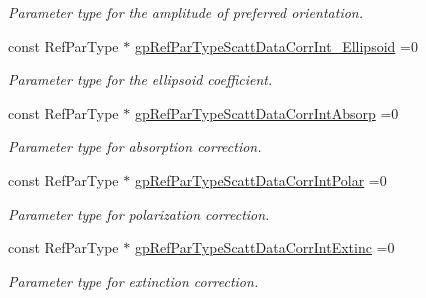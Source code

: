 \begin{DoxyCompactItemize}
\begin{DoxyCompactList}\small\item\em Parameter type for the amplitude of preferred orientation. \end{DoxyCompactList}\item 
\mbox{\label{namespace_obj_cryst_a90f81e18ffcae437b1fb46c56ffee2e5}} 
const Ref\+Par\+Type $\ast$ \mbox{\hyperlink{namespace_obj_cryst_a90f81e18ffcae437b1fb46c56ffee2e5}{gp\+Ref\+Par\+Type\+Scatt\+Data\+Corr\+Int\+\_\+\+Ellipsoid}} =0
\begin{DoxyCompactList}\small\item\em Parameter type for the ellipsoid coefficient. \end{DoxyCompactList}\item 
\mbox{\label{namespace_obj_cryst_a4eb6ef574a91724b70612235904156dc}} 
const Ref\+Par\+Type $\ast$ \mbox{\hyperlink{namespace_obj_cryst_a4eb6ef574a91724b70612235904156dc}{gp\+Ref\+Par\+Type\+Scatt\+Data\+Corr\+Int\+Absorp}} =0
\begin{DoxyCompactList}\small\item\em Parameter type for absorption correction. \end{DoxyCompactList}\item 
\mbox{\label{namespace_obj_cryst_af54e8bf4aee5d3888c88a183c12bef1a}} 
const Ref\+Par\+Type $\ast$ \mbox{\hyperlink{namespace_obj_cryst_af54e8bf4aee5d3888c88a183c12bef1a}{gp\+Ref\+Par\+Type\+Scatt\+Data\+Corr\+Int\+Polar}} =0
\begin{DoxyCompactList}\small\item\em Parameter type for polarization correction. \end{DoxyCompactList}\item 
\mbox{\label{namespace_obj_cryst_af8cea1d7c043fb0ad28e74a06246e968}} 
const Ref\+Par\+Type $\ast$ \mbox{\hyperlink{namespace_obj_cryst_af8cea1d7c043fb0ad28e74a06246e968}{gp\+Ref\+Par\+Type\+Scatt\+Data\+Corr\+Int\+Extinc}} =0
\begin{DoxyCompactList}\small\item\em Parameter type for extinction correction. \end{DoxyCompactList}\item 
\mbox{\label{namespace_obj_cryst_a647de83807cf5671a6ffd8c402a6ebf2}} 

\end{DoxyCompactItemize}
